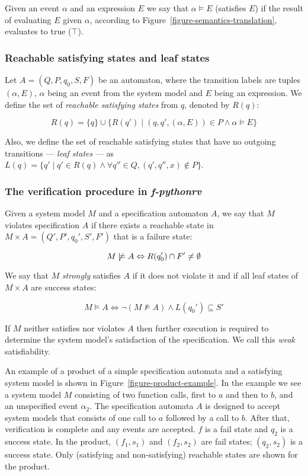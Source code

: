 Given an event $\alpha$ and an expression $E$ we say that $\alpha \models E$
(satisfies $E$) if the result of evaluating $E$ given $\alpha$, according to
Figure~\ref{figure-semantics-translation}, evaluates to true ($\top$).


\subsubsection{Reachable satisfying states and leaf states}

Let $A = (Q,P,q_0,S,F)$ be an automaton, where the transition labels are tuples
$(\alpha, E)$, $\alpha$ being an event from the system model and $E$ being an
expression. We define the set of \textit{reachable satisfying states} from $q$,
denoted by $R(q)$:

\medskip
\[
  R(q) = \{q\} \cup \{R(q') \; | \; (q,q',(\alpha,E)) \in P \wedge \alpha \models E\}
\]
\medskip

Also, we define the set of reachable satisfying states that have no outgoing
transitions --- \textit{leaf states} --- as $L(q) = \{q' \; | \; q' \in R(q)
\wedge \forall q'' \in Q, (q',q'',x) \notin P\}$.


\subsubsection{The verification procedure in \textit{f-pythonrv}}

Given a system model $M$ and a specification automaton $A$, we say that $M$
violates specification $A$ if there exists a reachable state in $M \times A = (Q',
P', q_0', S', F')$ that is a failure state:

\medskip
\[
  M \not\models A \Leftrightarrow R(q_0') \cap F' \neq \emptyset \\
\]
\medskip

We say that $M$ \textit{strongly} satisfies $A$ if it does not violate it and if all
leaf states of $M \times A$ are success states:

\medskip
\[
  M \models A \Leftrightarrow \neg(M \not\models A) \wedge L(q_0') \subseteq S'
\]
\medskip

If $M$ neither satisfies nor violates $A$ then further execution is required to
determine the system model's satisfaction of the specification. We call this
\textit{weak} satisfiability.

An example of a product of a simple specification automata and a satisfying
system model is shown in Figure~\ref{figure-product-example}. In the example we
see a system model $M$ consisting of two function calls, first to $a$ and then
to $b$, and an unspecified event $\alpha_2$. The specification automata $A$ is
designed to accept system models that consists of one call to $a$ followed by a
call to $b$. After that, verification is complete and any events are accepted.
$f$ is a fail state and $q_2$ is a success state. In the product, $(f_1,s_1)$
and $(f_2,s_2)$ are fail states; $(q_2,s_2)$ is a success state. Only
(satisfying and non-satisfying) reachable states are shown for the product.

